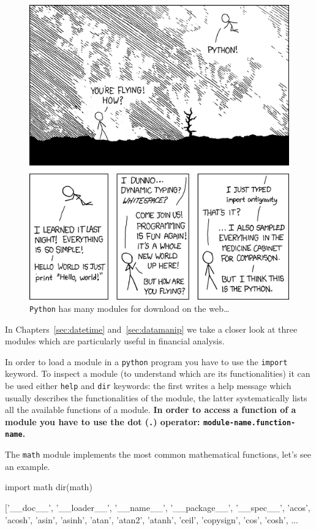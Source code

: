 \begin{figure}
\centering
\includegraphics[width=0.5\linewidth]{figures/python.png}
\caption{\texttt{Python} has many modules for download on the web\ldots}
\label{fig:fancy_module}
\end{figure}

In Chapters~\ref{sec:datetime} and~\ref{sec:datamanip} we take a closer look at three modules which are particularly useful in financial analysis.

In order to load a module in a \texttt{python} program you have to use the \texttt{import} keyword. To inspect a module (to understand which are its functionalities) it can be used either \texttt{help} and \texttt{dir} keywords: the first writes a help message which usually describes the functionalities of the module, the latter systematically lists all the available functions of a module.
\textbf{In order to access a function of a module you have to use the dot (\texttt{.}) operator: \texttt{module-name.function-name}.}

The \texttt{math} module implements the most common mathematical functions, let's see an example. 

\begin{ipython}
import math
dir(math)
\end{ipython}
\begin{ioutput}
['\_\_doc\_\_',
 '\_\_loader\_\_',
 '\_\_name\_\_',
 '\_\_package\_\_',
 '\_\_spec\_\_',
 'acos',
 'acosh',
 'asin',
 'asinh',
 'atan',
 'atan2',
 'atanh',
 'ceil',
 'copysign',
 'cos',
 'cosh',
...	
\end{ioutput}

